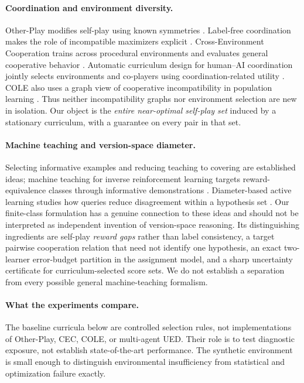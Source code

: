 \documentclass[11pt]{article}
\theoremstyle{definition}\newtheorem{definition}[theorem]{Definition}
\newcommand{\1}{\mathbf{1}}
\begin{document}
\paragraph{Coordination and environment diversity.}
Other-Play modifies self-play using known symmetries \citep{hu2020}. Label-free coordination makes the role of incompatible maximizers explicit \citep{treutlein2021}. Cross-Environment Cooperation trains across procedural environments and evaluates general cooperative behavior \citep{jha2025}. Automatic curriculum design for human--AI coordination jointly selects environments and co-players using coordination-related utility \citep{you2025}. COLE also uses a graph view of cooperative incompatibility in population learning \citep{li2023}. Thus neither incompatibility graphs nor environment selection are new in isolation. Our object is the \emph{entire near-optimal self-play set} induced by a stationary curriculum, with a guarantee on every pair in that set.

\paragraph{Machine teaching and version-space diameter.}
Selecting informative examples and reducing teaching to covering are established ideas; machine teaching for inverse reinforcement learning targets reward-equivalence classes through informative demonstrations \citep{brown2019}. Diameter-based active learning studies how queries reduce disagreement within a hypothesis set \citep{tosh2017}. Our finite-class formulation has a genuine connection to these ideas and should not be interpreted as independent invention of version-space reasoning. Its distinguishing ingredients are self-play \emph{reward gaps} rather than label consistency, a target pairwise cooperation relation that need not identify one hypothesis, an exact two-learner error-budget partition in the assignment model, and a sharp uncertainty certificate for curriculum-selected score sets. We do not establish a separation from every possible general machine-teaching formalism.

\paragraph{What the experiments compare.}
The baseline curricula below are controlled selection rules, not implementations of Other-Play, CEC, COLE, or multi-agent UED. Their role is to test diagnostic exposure, not establish state-of-the-art performance. The synthetic environment is small enough to distinguish environmental insufficiency from statistical and optimization failure exactly.
\end{document}
